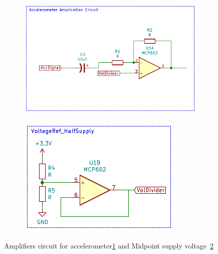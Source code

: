 \begin{figure}[]
    \centering
    \begin{subfigure}{0.3\textwidth}
        \centering
        \includegraphics[width=\linewidth]{Chapters/4CHP/Figures/AmpAccCirc.pdf}
        \caption{}{}
        \label{subfig:AccAmpCirc}
    \end{subfigure}
    \begin{subfigure}{0.3\textwidth}
        \centering
        \includegraphics[width=\linewidth]{Chapters/4CHP/Figures/HalfSupply.pdf}
        \caption{}{}
        \label{subfig:VoltageDiv}
    \end{subfigure}
    \caption{Amplifiers circuit for accelerometer\ref{subfig:AccAmpCirc} and Midpoint supply voltage~\ref{subfig:VoltageDiv}}{}
\label{fig:accCircCom}
\end{figure}

